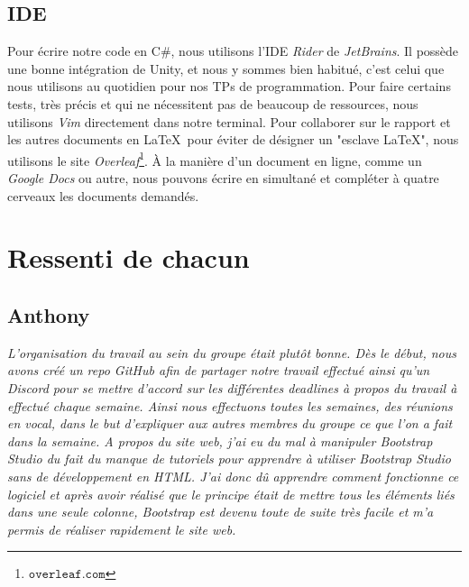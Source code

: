 \documentclass[12pt,a4paper]{article}
\begin{document}
    \subsection{IDE}
        Pour écrire notre code en C\#, nous utilisons l'IDE \textsl{Rider} de 
        \textsl{JetBrains}. Il possède une bonne intégration de Unity, et nous
        y sommes bien habitué, c'est celui que nous utilisons au quotidien pour
        nos TPs de programmation. Pour faire certains tests, très précis et qui
        ne nécessitent pas de beaucoup de ressources, nous utilisons \textsl{Vim}
        directement dans notre terminal.
        Pour collaborer sur le rapport et les autres documents en \LaTeX\, 
        pour éviter de désigner un "esclave \LaTeX", nous utilisons le site 
        \textsl{Overleaf}\footnote{\(\mathtt{overleaf.com}\)}. 
        À la manière d'un document en ligne, comme 
        un \textsl{Google Docs} ou autre, nous pouvons écrire en
        simultané et compléter à quatre cerveaux les documents demandés.

\clearpage

\section{Ressenti de chacun}
    \subsection{Anthony}
        \textit{L’organisation du travail au sein du groupe était plutôt bonne.
        Dès le début, nous avons créé un repo \textsl{GitHub} afin de partager notre travail 
        effectué ainsi qu’un \textsl{Discord} pour se mettre d’accord sur les différentes 
        deadlines à propos du travail à effectué chaque semaine. Ainsi nous 
        effectuons toutes les semaines, des réunions en vocal, dans le but 
        d’expliquer aux autres membres du groupe ce que l’on a fait dans la 
        semaine. A propos du site web, j’ai eu du mal à manipuler \textsl{Bootstrap Studio} 
        du fait du manque de tutoriels pour apprendre à utiliser \textsl{Bootstrap Studio}
        sans de développement en HTML. J’ai donc dû apprendre comment fonctionne 
        ce logiciel et après avoir réalisé que le principe était de mettre tous 
        les éléments liés dans une seule colonne, \textsl{Bootstrap} est devenu toute de 
        suite très facile et m’a permis de réaliser rapidement le site web.}
  
\end{document}
